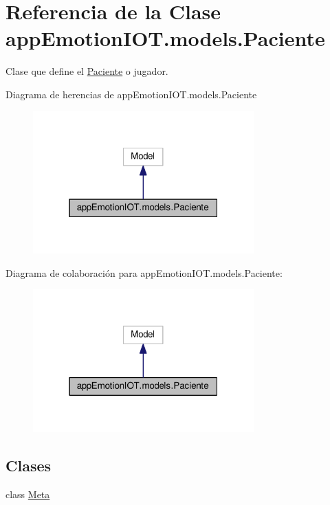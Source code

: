 \hypertarget{classappEmotionIOT_1_1models_1_1Paciente}{}\section{Referencia de la Clase app\+Emotion\+I\+O\+T.\+models.\+Paciente}
\label{classappEmotionIOT_1_1models_1_1Paciente}


Clase que define el \hyperlink{classappEmotionIOT_1_1models_1_1Paciente}{Paciente} o jugador.  




Diagrama de herencias de app\+Emotion\+I\+O\+T.\+models.\+Paciente
\nopagebreak
\begin{figure}[H]
\begin{center}
\leavevmode
\includegraphics[width=241pt]{classappEmotionIOT_1_1models_1_1Paciente__inherit__graph}
\end{center}
\end{figure}


Diagrama de colaboración para app\+Emotion\+I\+O\+T.\+models.\+Paciente\+:
\nopagebreak
\begin{figure}[H]
\begin{center}
\leavevmode
\includegraphics[width=241pt]{classappEmotionIOT_1_1models_1_1Paciente__coll__graph}
\end{center}
\end{figure}
\subsection*{Clases}
\begin{DoxyCompactItemize}
\item 
class \hyperlink{classappEmotionIOT_1_1models_1_1Paciente_1_1Meta}{Meta}
\end{DoxyCompactItemize}

